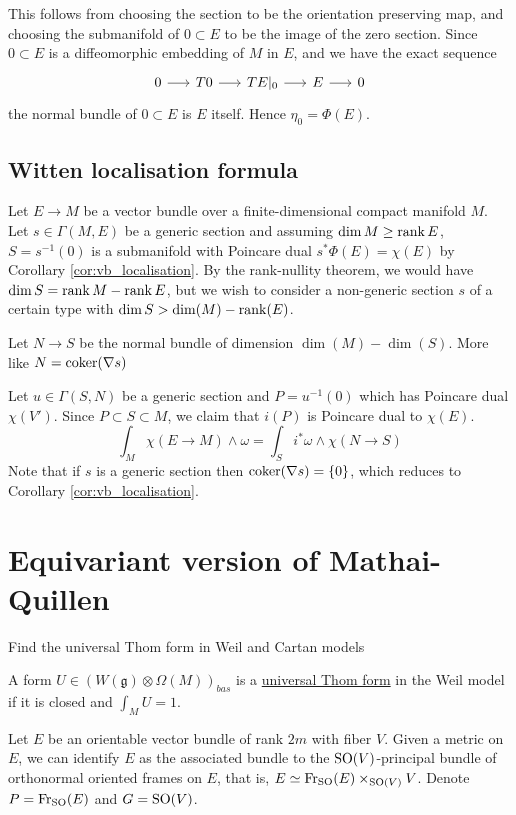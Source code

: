This follows from choosing the section to be the orientation preserving map, and
choosing the submanifold of $0\subset E$ to be the image of the zero section.
Since $0\subset E$ is a diffeomorphic embedding of $M$ in $E$, and we have the
exact sequence
\[
	\begin{tikzcd}[column sep = 1.6em]
		0 \arrow[r] & T0 \arrow[r] & TE|_0 \arrow[r] 
						& E \arrow[r] & 0
	\end{tikzcd}
	\]
the normal bundle of  $0\subset E$ is  $E$ itself.
Hence $\eta_0 = \Phi(E)$. 

\subsection{Witten localisation formula}
Let $E\to M$ be a vector bundle over a finite-dimensional compact manifold  $M$.
Let $s\in\Gamma(M,E)$ be a generic section and assuming $\dim M \geq \operatorname{rank} E$, 
$S=s^{-1}(0)$ is a submanifold with
Poincare dual $s^*\Phi(E)=\chi(E)$ by Corollary \ref{cor:vb_localisation}. 
By the rank-nullity theorem, we would have $\dim S = \operatorname{rank} M - \operatorname{rank} E$, but 
we wish to consider a non-generic section $s$ of a certain type with 
$\dim S > \dim(M)-\operatorname{rank}(E)$. 



Let  $N\to S$ be the normal bundle of dimension
$\dim(M)-\dim(S)$.  More like $N = \operatorname{coker} (\nabla s)$

Let  $u\in\Gamma(S,N)$ be a generic section and
$P=u^{-1}(0)$ which has Poincare dual $\chi(V')$. Since  $P\subset S \subset M$,
we claim that $i(P)$ is Poincare dual to  $\chi(E)$.
\[
\int_M \chi(E\to M)\wedge \omega = \int_{S} i^*\omega \wedge \chi(N\to S)
\] 
Note that if $s$ is a generic section then  $\operatorname{coker} (\nabla s) = \{0\}$, which
reduces to Corollary \ref{cor:vb_localisation}.



\section{Equivariant version of Mathai-Quillen}
Find the universal Thom form in Weil and Cartan models
\begin{defn}
	A form $U\in (W(\mathfrak{g})\otimes \Omega(M))_{bas}$ is a
	\underline{universal Thom form} in the Weil model if it is closed and
	$\int_M U = 1$. 
\end{defn} 

Let $E$ be an orientable vector bundle of rank  $2m$ with fiber  $V$. Given a
metric on  $E$, we can identify  $E$ as the associated bundle to the
$\operatorname{SO}(V)$-principal bundle of orthonormal oriented frames on $E$, that is, $E
\simeq \operatorname{Fr}_{\operatorname{SO}}(E) \times_{\operatorname{SO}(V)} V$. Denote $P=\operatorname{Fr}_{\operatorname{SO}}(E)$ and $G=\operatorname{SO}(V)$.

